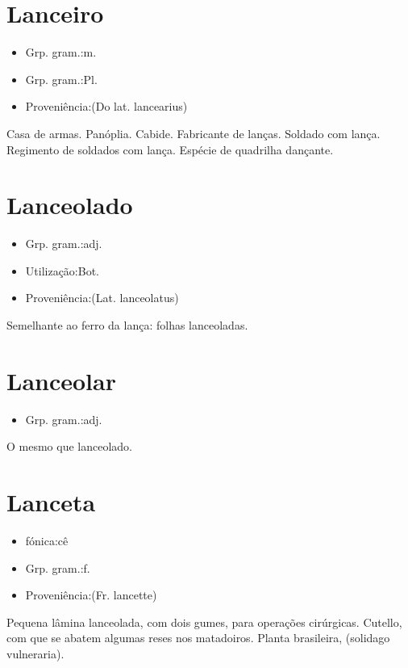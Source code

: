 \section{Lanceiro}
\begin{itemize}
\item {Grp. gram.:m.}
\end{itemize}
\begin{itemize}
\item {Grp. gram.:Pl.}
\end{itemize}
\begin{itemize}
\item {Proveniência:(Do lat. \textunderscore lancearius\textunderscore )}
\end{itemize}
Casa de armas.
Panóplia.
Cabide.
Fabricante de lanças.
Soldado com lança.
Regimento de soldados com lança.
Espécie de quadrilha dançante.
\section{Lanceolado}
\begin{itemize}
\item {Grp. gram.:adj.}
\end{itemize}
\begin{itemize}
\item {Utilização:Bot.}
\end{itemize}
\begin{itemize}
\item {Proveniência:(Lat. \textunderscore lanceolatus\textunderscore )}
\end{itemize}
Semelhante ao ferro da lança: \textunderscore folhas lanceoladas\textunderscore .
\section{Lanceolar}
\begin{itemize}
\item {Grp. gram.:adj.}
\end{itemize}
O mesmo que \textunderscore lanceolado\textunderscore .
\section{Lanceta}
\begin{itemize}
\item {fónica:cê}
\end{itemize}
\begin{itemize}
\item {Grp. gram.:f.}
\end{itemize}
\begin{itemize}
\item {Proveniência:(Fr. \textunderscore lancette\textunderscore )}
\end{itemize}
Pequena lâmina lanceolada, com dois gumes, para operações cirúrgicas.
Cutello, com que se abatem algumas reses nos matadoiros.
Planta brasileira, (\textunderscore solidago vulneraria\textunderscore ).
